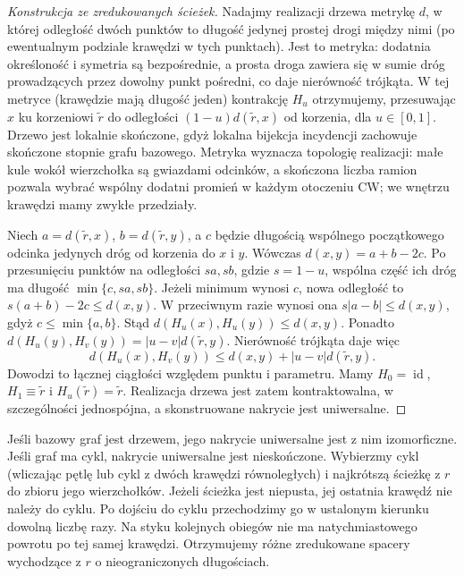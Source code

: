 \begin{proof}[Konstrukcja ze zredukowanych ścieżek]
Nadajmy realizacji drzewa metrykę $d$, w której odległość
dwóch punktów to długość jedynej prostej drogi między nimi
(po ewentualnym podziale krawędzi w tych punktach).
Jest to metryka: dodatnia określoność i symetria są
bezpośrednie, a prosta droga zawiera się w sumie dróg
prowadzących przez dowolny punkt pośredni, co daje
nierówność trójkąta. W tej metryce (krawędzie mają
długość jeden) kontrakcję $H_u$ otrzymujemy, przesuwając $x$ ku korzeniowi
$\widetilde r$ do odległości $(1-u)d(\widetilde r,x)$
od korzenia, dla $u\in[0,1]$. Drzewo jest lokalnie
skończone, gdyż lokalna bijekcja
incydencji zachowuje skończone stopnie grafu bazowego.
Metryka wyznacza topologię realizacji: małe kule wokół
wierzchołka są gwiazdami odcinków, a skończona liczba
ramion pozwala wybrać wspólny dodatni promień w każdym
otoczeniu CW; we wnętrzu krawędzi mamy zwykłe przedziały.

Niech $a=d(\widetilde r,x)$, $b=d(\widetilde r,y)$,
a $c$ będzie długością wspólnego początkowego odcinka
jedynych dróg od korzenia do $x$ i $y$. Wówczas
$d(x,y)=a+b-2c$. Po przesunięciu punktów na odległości
$sa,sb$, gdzie $s=1-u$, wspólna część ich dróg
ma długość $\min\{c,sa,sb\}$. Jeżeli minimum wynosi $c$,
nowa odległość to $s(a+b)-2c\leq d(x,y)$.
W przeciwnym razie wynosi ona $s|a-b|\leq d(x,y)$,
gdyż $c\leq\min\{a,b\}$. Stąd
$d(H_u(x),H_u(y))\leq d(x,y)$. Ponadto
$d(H_u(y),H_v(y))=|u-v|d(\widetilde r,y)$.
Nierówność trójkąta daje więc
\[
d(H_u(x),H_v(y))\leq d(x,y)+|u-v|d(\widetilde r,y).
\]
Dowodzi to łącznej ciągłości względem punktu i parametru.
Mamy $H_0=\operatorname{id}$, $H_1\equiv\widetilde r$
i $H_u(\widetilde r)=\widetilde r$. Realizacja drzewa
jest zatem kontraktowalna, w szczególności jednospójna,
a skonstruowane nakrycie jest uniwersalne.
\end{proof}

\begin{uwaga}
Jeśli bazowy graf jest drzewem, jego nakrycie uniwersalne
jest z nim izomorficzne. Jeśli graf ma cykl, nakrycie
uniwersalne jest nieskończone. Wybierzmy cykl
(wliczając pętlę lub cykl z dwóch krawędzi równoległych)
i najkrótszą ścieżkę z $r$ do zbioru jego wierzchołków.
Jeżeli ścieżka jest niepusta, jej ostatnia krawędź
nie należy do cyklu. Po dojściu do cyklu przechodzimy
go w ustalonym kierunku dowolną liczbę razy.
Na styku kolejnych obiegów nie ma natychmiastowego
powrotu po tej samej krawędzi. Otrzymujemy różne
zredukowane spacery wychodzące z $r$ o nieograniczonych
długościach.
\end{uwaga}

